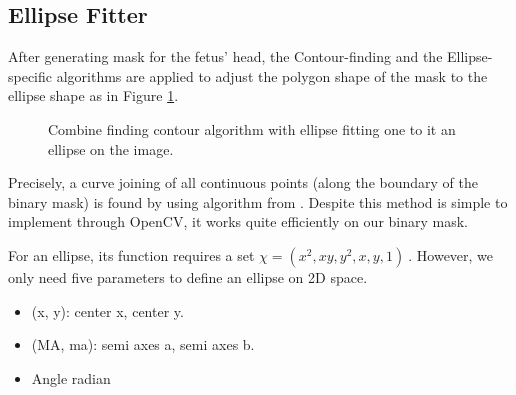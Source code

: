 \subsection{Ellipse Fitter}
\noindent

	After generating mask for the fetus' head, the Contour-finding and the Ellipse-specific algorithms are applied to adjust the polygon shape of the mask to the ellipse shape as in Figure \ref{fig:post_process}.
	
	\begin{figure}[H]
		\centering
		\hfill %
		\hfill %
		\caption{Combine finding contour algorithm with ellipse fitting one to  it an ellipse on the image.}
		\label{fig:post_process}
	\end{figure}

	Precisely, a curve joining of all continuous points (along the boundary of the binary mask) is found by using algorithm from \cite{findContours}. Despite this method is simple to implement through OpenCV, it works quite efficiently on our binary mask.
	
	
	For an ellipse, its function requires a set $ \chi = (x^2, xy, y^2, x, y, 1)\ $. However, we only need five parameters to define an ellipse on 2D space. 
	
	\begin{itemize}
		\item (x, y): center x, center y.
		\item (MA, ma): semi axes a, semi axes b.
		\item Angle radian
	\end{itemize}
	
